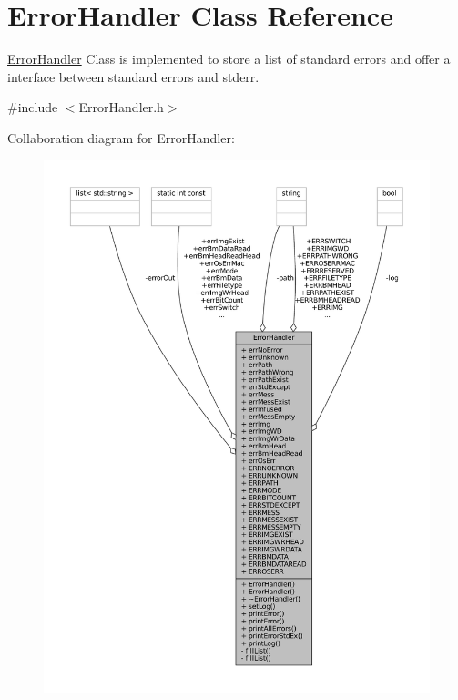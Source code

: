 \hypertarget{classErrorHandler}{}\section{Error\+Handler Class Reference}
\label{classErrorHandler}


\mbox{\hyperlink{classErrorHandler}{Error\+Handler}} Class is implemented to store a list of standard errors and offer a interface between standard errors and stderr.  




{\ttfamily \#include $<$Error\+Handler.\+h$>$}



Collaboration diagram for Error\+Handler\+:
\nopagebreak
\begin{figure}[H]
\begin{center}
\leavevmode
\includegraphics[width=350pt]{classErrorHandler__coll__graph}
\end{center}
\end{figure}
